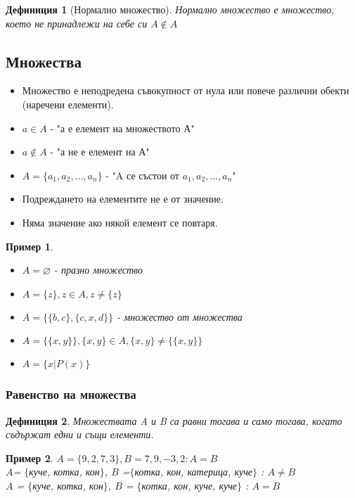 \documentclass[fleqn, 12pt]{article}
\newtheorem{example}{Пример}[subsection]
\newtheorem{definition}{Дефиниция}[subsection]
\begin{document}
\begin{definition}[Нормално множество]
Нормално множество е множество, което не принадлежи на себе си $A \notin A$
\end{definition}

\subsection{Множества}
\begin{itemize}
	\item Множество е неподредена съвокупност от нула или повече различни обекти (наречени елементи). 
 	\item $a \in A$ - "а е елемент на множеството А" 
	\item $a \notin A$ - "а не е елемент на А"
	\item $A = \{ a_1, a_2, ..., a_n\}$ - "A се състои от $a_1, a_2, ..., a_n$"
	\item Подреждането на елементите не е от значение.
	\item Няма значение ако някой елемент се повтаря. 
\end{itemize}

\begin{example}

\begin{itemize}
	\item $A = \varnothing$ - празно множество 
	\item $A = \{z\}, z \in A, z \neq \{z\}$
	\item $A =\{ \{b,c \}, \{c, x, d \} \}$ - множество от множества 
	\item $A = \{\{ x, y \}\}, \{x,y\} \in A, \{x,y\} \neq \{\{x,y\}\}$
	\item $A = \{x | P(x) \}$
\end{itemize}

\end{example}

\subsubsection{Равенство на множества}

\begin{definition}
Множествата A и B са равни тогава и само тогава, когато съдържат едни и същи елементи.
\end{definition}

\begin{example}
$A = \{9, 2, 7, 3\}, B = {7, 9, -3, 2} : A = B$\\
$A$= $\{$куче, котка, кон$\}$, $B$ =$\{$котка, кон, катерица, куче$\}$ : $A\neq B$ \\
$A$ = $\{$куче, котка, кон$\}$, $B$ = $\{$котка, кон, куче, куче$\}$  : $A = B$
\end{example}
\end{document}
